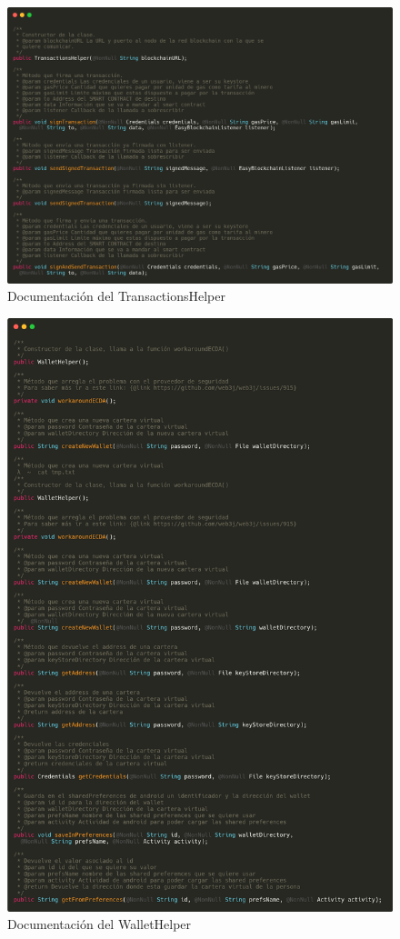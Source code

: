 \begin{figure}[h!]
  \centering
  \includegraphics[width=1\linewidth]{figs/Anexo/Docs/trans}
  \caption[Documentación de TransactionsHelper]{Documentación del TransactionsHelper}
  \label{fig:docsTransHelper}
\end{figure}

\begin{figure}[h!]
  \centering
  \includegraphics[width=1\linewidth]{figs/Anexo/Docs/wallet}
  \caption[Documentación de WalletHelper]{Documentación del WalletHelper}
  \label{fig:docsWalletHelper}
\end{figure}


